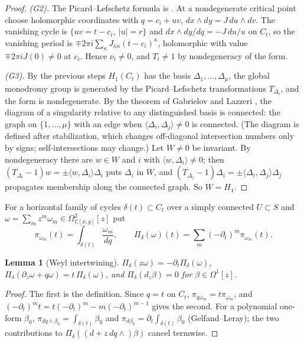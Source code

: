 \documentclass[11pt]{article}
\numberwithin{equation}{section}
\newtheorem{lemma}[theorem]{Lemma}
\theoremstyle{definition}
\theoremstyle{remark}
\newcommand{\C}{\mathbb C}\newcommand{\Q}{\mathbb Q}\newcommand{\R}{\mathbb R}\newcommand{\Z}{\mathbb Z}
\begin{document}
\begin{proof}
\emph{(G2).} The Picard--Lefschetz formula is \cite[\S1.3, p.~26]{AGV}. At a
nondegenerate critical point choose holomorphic coordinates with
$q=c_i+uv$, $dx\wedge dy=J\,du\wedge dv$. The vanishing cycle is
$\{uv=t-c_i,\ |u|=r\}$ and $dx\wedge dy/dq=-J\,du/u$ on $C_t$, so the vanishing
period is $\mp2\pi i\sum_\kappa J_{\kappa\kappa}(t-c_i)^\kappa$, holomorphic with
value $\mp2\pi iJ(0)\ne0$ at $c_i$. Hence $\nu_i\ne0$, and $T_i\ne1$ by
nondegeneracy of the form.

\emph{(G3).} By the previous steps $H_1(C_t)$ has the basis
$\Delta_1,\dots,\Delta_\mu$, the global monodromy group is generated by the
Picard--Lefschetz transformations $T_{\Delta_i}$, and the form is nondegenerate.
By the theorem of Gabrielov and Lazzeri \cite[Theorem~3.3]{AGV}, the diagram of
a singularity relative to any distinguished basis is connected: the graph on
$\{1,\dots,\mu\}$ with an edge when $\langle\Delta_i,\Delta_j\rangle\ne0$ is
connected. (The diagram is defined after stabilization, which changes
off-diagonal intersection numbers only by signs; self-intersections may change.) Let $W\ne0$ be invariant. By
nondegeneracy there are $w\in W$ and $i$ with $\langle w,\Delta_i\rangle\ne0$;
then $(T_{\Delta_i}-1)w=\pm\langle w,\Delta_i\rangle\Delta_i$ puts $\Delta_i$ in
$W$, and $(T_{\Delta_j}-1)\Delta_i=\pm\langle\Delta_i,\Delta_j\rangle\Delta_j$
propagates membership along the connected graph. So $W=H_1$.
\end{proof}

For a horizontal family of cycles $\delta(t)\subset C_t$ over a simply connected
$U\subset S$ and $\omega=\sum_m z^m\omega_m\in\Omega^2_{\C[x,y]}[z]$ put
\[
 \pi_{\omega_m}(t)=\int_{\delta(t)}\frac{\omega_m}{dq},\qquad
 \Pi_\delta(\omega)(t)=\sum_m(-\partial_t)^m\pi_{\omega_m}(t).
\]
\begin{lemma}[Weyl intertwining]\label{lem:Pi}
$\Pi_\delta(z\omega)=-\partial_t\Pi_\delta(\omega)$,
$\Pi_\delta(\partial_z\omega+q\omega)=t\,\Pi_\delta(\omega)$, and
$\Pi_\delta(d_z\beta)=0$ for $\beta\in\Omega^1[z]$.
\end{lemma}
\begin{proof}
The first is the definition. Since $q=t$ on $C_t$, $\pi_{q\omega_m}=t\pi_{\omega_m}$,
and $(-\partial_t)^mt=t(-\partial_t)^m-m(-\partial_t)^{m-1}$ gives the second.
For a polynomial one-form $\beta_0$, $\pi_{dq\wedge\beta_0}=\int_{\delta(t)}\beta_0$
and $\pi_{d\beta_0}=\partial_t\int_{\delta(t)}\beta_0$ (Gelfand--Leray); the two
contributions to $\Pi_\delta((d+z\,dq\wedge)\beta)$ cancel termwise.
\end{proof}
\end{document}
